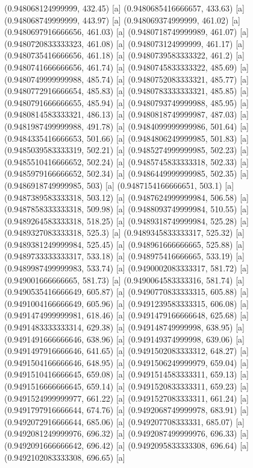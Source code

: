 {{{(0.948068124999999, 432.45) [a] 
(0.9480685416666657, 433.63) [a] 
(0.948068749999999, 443.97) [a] 
(0.948069374999999, 461.02) [a] 
(0.9480697916666656, 461.03) [a] 
(0.9480718749999989, 461.07) [a] 
(0.9480720833333323, 461.08) [a] 
(0.948073124999999, 461.17) [a] 
(0.9480735416666656, 461.18) [a] 
(0.9480739583333322, 461.2) [a] 
(0.9480741666666656, 461.74) [a] 
(0.9480745833333322, 485.69) [a] 
(0.9480749999999988, 485.74) [a] 
(0.9480752083333321, 485.77) [a] 
(0.9480772916666654, 485.83) [a] 
(0.9480783333333321, 485.85) [a] 
(0.9480791666666655, 485.94) [a] 
(0.9480793749999988, 485.95) [a] 
(0.9480814583333321, 486.13) [a] 
(0.9480818749999987, 487.03) [a] 
(0.9481987499999988, 491.78) [a] 
(0.9484099999999986, 501.64) [a] 
(0.9484335416666653, 501.66) [a] 
(0.9484806249999985, 501.83) [a] 
(0.9485039583333319, 502.21) [a] 
(0.9485274999999985, 502.23) [a] 
(0.9485510416666652, 502.24) [a] 
(0.9485745833333318, 502.33) [a] 
(0.9485979166666652, 502.34) [a] 
(0.9486449999999985, 502.35) [a] 
(0.9486918749999985, 503) [a] 
(0.9487154166666651, 503.1) [a] 
(0.9487389583333318, 503.12) [a] 
(0.9487624999999984, 506.58) [a] 
(0.9487858333333318, 509.98) [a] 
(0.9488093749999984, 510.55) [a] 
(0.9489264583333318, 518.25) [a] 
(0.9489318749999984, 525.28) [a] 
(0.9489327083333318, 525.3) [a] 
(0.9489345833333317, 525.32) [a] 
(0.9489381249999984, 525.45) [a] 
(0.948961666666665, 525.88) [a] 
(0.9489733333333317, 533.18) [a] 
(0.948975416666665, 533.19) [a] 
(0.9489987499999983, 533.74) [a] 
(0.9490002083333317, 581.72) [a] 
(0.949001666666665, 581.73) [a] 
(0.9490064583333316, 581.74) [a] 
(0.9490535416666649, 605.87) [a] 
(0.9490770833333315, 605.88) [a] 
(0.9491004166666649, 605.96) [a] 
(0.9491239583333315, 606.08) [a] 
(0.9491474999999981, 618.46) [a] 
(0.9491479166666648, 625.68) [a] 
(0.9491483333333314, 629.38) [a] 
(0.949148749999998, 638.95) [a] 
(0.9491491666666646, 638.96) [a] 
(0.949149374999998, 639.06) [a] 
(0.9491497916666646, 641.65) [a] 
(0.9491502083333312, 648.27) [a] 
(0.9491504166666646, 648.95) [a] 
(0.9491506249999979, 659.04) [a] 
(0.9491510416666645, 659.08) [a] 
(0.9491514583333311, 659.13) [a] 
(0.9491516666666645, 659.14) [a] 
(0.9491520833333311, 659.23) [a] 
(0.9491524999999977, 661.22) [a] 
(0.9491527083333311, 661.24) [a] 
(0.9491797916666644, 674.76) [a] 
(0.9492068749999978, 683.91) [a] 
(0.9492072916666644, 685.06) [a] 
(0.949207708333331, 685.07) [a] 
(0.9492081249999976, 696.32) [a] 
(0.9492087499999976, 696.33) [a] 
(0.9492091666666642, 696.42) [a] 
(0.9492095833333308, 696.64) [a] 
(0.9492102083333308, 696.65) [a] 
}}}
